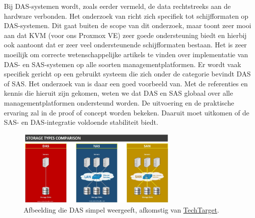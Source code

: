 Bij DAS-systemen wordt, zoals eerder vermeld, de data rechtstreeks aan de hardware verbonden. Het onderzoek van \textcite{joshi2014empirical} richt zich specifiek tot schijfformaten op DAS-systemen.
Dit gaat buiten de scope van dit onderzoek, maar toont zeer mooi aan dat KVM (voor ons Proxmox VE) zeer goede ondersteuning biedt en hierbij ook aantoont dat er zeer veel ondersteunende schijfformaten bestaan.
Het is zeer moeilijk om correcte wetenschappelijke artikels te vinden over implementatie van DAS- en SAS-systemen op alle soorten managementplatformen. Er wordt vaak specifiek gericht op een gebruikt systeem die zich onder de categorie bevindt DAS of SAS. Het onderzoek van \textcite{joshi2014empirical} is daar een goed voorbeeld van.
Met de referenties en kennis die hieruit zijn gekomen, weten we dat DAS en SAS globaal over alle managementplatformen ondersteund worden. De uitvoering en de praktische ervaring zal in de proof of concept worden bekeken. Daaruit moet uitkomen of de SAS- en DAS-integratie voldoende stabiliteit biedt.

\begin{figure}[h!]
    \centering
    \includegraphics[width=0.7\textwidth]{../onderzoek/DAS.jpg} 
    \caption{Afbeelding die DAS simpel weergeeft, afkomstig van \href{https://networkwalks.com/storage-types-das-nas-san/I}{TechTarget}.}
    \label{fig:sas}
\end{figure}